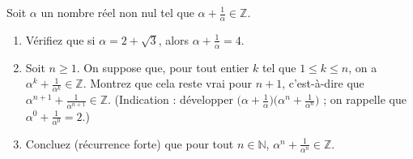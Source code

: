 Soit $\alpha$ un nombre réel non nul tel que $\alpha + \frac{1}{\alpha} \in \mathbb{Z}$.
\begin{enumerate}
  \item Vérifiez que si $\alpha = 2 + \sqrt{3}$, alors $\alpha + \frac{1}{\alpha} = 4$.
  \item Soit $n \geq 1$. On suppose que, pour tout entier $k$ tel que
  $1 \leq k \leq n$, on a $\alpha^k + \frac{1}{\alpha^k} \in \mathbb{Z}$.
  Montrez que cela reste vrai pour $n + 1$, c'est-à-dire que
  $\alpha^{n+1} + \frac{1}{\alpha^{n+1}} \in \mathbb{Z}$.
  (Indication : développer
  $\bigl(\alpha + \frac{1}{\alpha}\bigr)\bigl(\alpha^n + \frac{1}{\alpha^n}\bigr)$ ;
  on rappelle que $\alpha^0 + \frac{1}{\alpha^0} = 2$.)
  \item Concluez (récurrence forte) que pour tout $n \in \mathbb{N}$, $\alpha^n + \frac{1}{\alpha^n} \in \mathbb{Z}$.
\end{enumerate}
